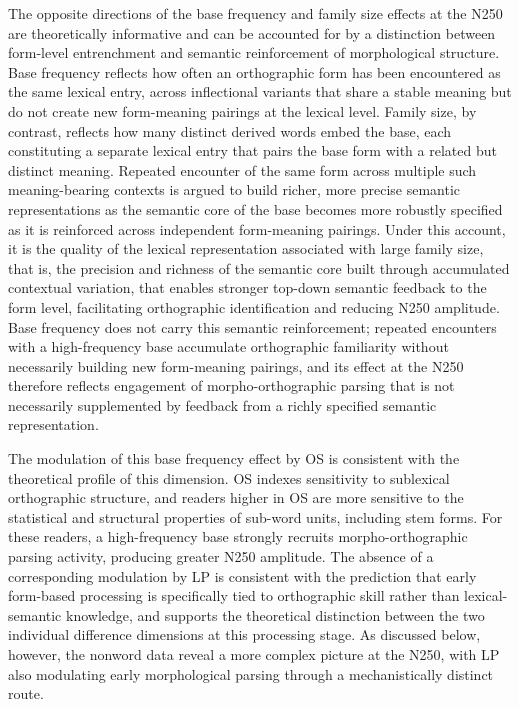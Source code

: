 \documentclass[utf8]{FrontiersinHarvard} %
\begin{document}
	The opposite directions of the base frequency and family size effects at the N250 are theoretically informative and can be accounted for by a distinction between form-level entrenchment and semantic reinforcement of morphological structure. Base frequency reflects how often an orthographic form has been encountered as the same lexical entry, across inflectional variants that share a stable meaning but do not create new form-meaning pairings at the lexical level. Family size, by contrast, reflects how many distinct derived words embed the base, each constituting a separate lexical entry that pairs the base form with a related but distinct meaning. Repeated encounter of the same form across multiple such meaning-bearing contexts is argued to build richer, more precise semantic representations \citep{bolgerContextVariationDefinitions2008, liLearningNovelComplex2026} as the semantic core of the base becomes more robustly specified as it is reinforced across independent form-meaning pairings. Under this account, it is the quality of the lexical representation associated with large family size, that is, the precision and richness of the semantic core built through accumulated contextual variation, that enables stronger top-down semantic feedback to the form level, facilitating orthographic identification and reducing N250 amplitude. Base frequency does not carry this semantic reinforcement; repeated encounters with a high-frequency base accumulate orthographic familiarity without necessarily building new form-meaning pairings, and its effect at the N250 therefore reflects engagement of morpho-orthographic parsing that is not necessarily supplemented by feedback from a richly specified semantic representation.
	
	The modulation of this base frequency effect by OS is consistent with the theoretical profile of this dimension. OS indexes sensitivity to sublexical orthographic structure, and readers higher in OS are more sensitive to the statistical and structural properties of sub-word units, including stem forms. For these readers, a high-frequency base strongly recruits morpho-orthographic parsing activity, producing greater N250 amplitude. The absence of a corresponding modulation by LP is consistent with the prediction that early form-based processing is specifically tied to orthographic skill rather than lexical-semantic knowledge, and supports the theoretical distinction between the two individual difference dimensions at this processing stage. As discussed below, however, the nonword data reveal a more complex picture at the N250, with LP also modulating early morphological parsing through a mechanistically distinct route.
\end{document}
